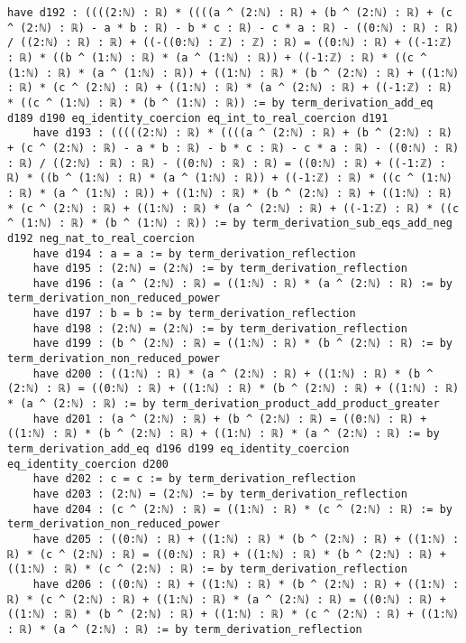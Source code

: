 \documentclass{article}
\begin{document}
\begin{tcolorbox}[colback=white!10, width=\linewidth]
\begin{lstlisting}[language=Lean4]
    have d192 : ((((2:ℕ) : ℝ) * ((((a ^ (2:ℕ) : ℝ) + (b ^ (2:ℕ) : ℝ) + (c ^ (2:ℕ) : ℝ) - a * b : ℝ) - b * c : ℝ) - c * a : ℝ) - ((0:ℕ) : ℝ) : ℝ) / ((2:ℕ) : ℝ) : ℝ) + ((-((0:ℕ) : ℤ) : ℤ) : ℝ) = ((0:ℕ) : ℝ) + ((-1:ℤ) : ℝ) * ((b ^ (1:ℕ) : ℝ) * (a ^ (1:ℕ) : ℝ)) + ((-1:ℤ) : ℝ) * ((c ^ (1:ℕ) : ℝ) * (a ^ (1:ℕ) : ℝ)) + ((1:ℕ) : ℝ) * (b ^ (2:ℕ) : ℝ) + ((1:ℕ) : ℝ) * (c ^ (2:ℕ) : ℝ) + ((1:ℕ) : ℝ) * (a ^ (2:ℕ) : ℝ) + ((-1:ℤ) : ℝ) * ((c ^ (1:ℕ) : ℝ) * (b ^ (1:ℕ) : ℝ)) := by term_derivation_add_eq d189 d190 eq_identity_coercion eq_int_to_real_coercion d191
    have d193 : (((((2:ℕ) : ℝ) * ((((a ^ (2:ℕ) : ℝ) + (b ^ (2:ℕ) : ℝ) + (c ^ (2:ℕ) : ℝ) - a * b : ℝ) - b * c : ℝ) - c * a : ℝ) - ((0:ℕ) : ℝ) : ℝ) / ((2:ℕ) : ℝ) : ℝ) - ((0:ℕ) : ℝ) : ℝ) = ((0:ℕ) : ℝ) + ((-1:ℤ) : ℝ) * ((b ^ (1:ℕ) : ℝ) * (a ^ (1:ℕ) : ℝ)) + ((-1:ℤ) : ℝ) * ((c ^ (1:ℕ) : ℝ) * (a ^ (1:ℕ) : ℝ)) + ((1:ℕ) : ℝ) * (b ^ (2:ℕ) : ℝ) + ((1:ℕ) : ℝ) * (c ^ (2:ℕ) : ℝ) + ((1:ℕ) : ℝ) * (a ^ (2:ℕ) : ℝ) + ((-1:ℤ) : ℝ) * ((c ^ (1:ℕ) : ℝ) * (b ^ (1:ℕ) : ℝ)) := by term_derivation_sub_eqs_add_neg d192 neg_nat_to_real_coercion
    have d194 : a = a := by term_derivation_reflection
    have d195 : (2:ℕ) = (2:ℕ) := by term_derivation_reflection
    have d196 : (a ^ (2:ℕ) : ℝ) = ((1:ℕ) : ℝ) * (a ^ (2:ℕ) : ℝ) := by term_derivation_non_reduced_power
    have d197 : b = b := by term_derivation_reflection
    have d198 : (2:ℕ) = (2:ℕ) := by term_derivation_reflection
    have d199 : (b ^ (2:ℕ) : ℝ) = ((1:ℕ) : ℝ) * (b ^ (2:ℕ) : ℝ) := by term_derivation_non_reduced_power
    have d200 : ((1:ℕ) : ℝ) * (a ^ (2:ℕ) : ℝ) + ((1:ℕ) : ℝ) * (b ^ (2:ℕ) : ℝ) = ((0:ℕ) : ℝ) + ((1:ℕ) : ℝ) * (b ^ (2:ℕ) : ℝ) + ((1:ℕ) : ℝ) * (a ^ (2:ℕ) : ℝ) := by term_derivation_product_add_product_greater
    have d201 : (a ^ (2:ℕ) : ℝ) + (b ^ (2:ℕ) : ℝ) = ((0:ℕ) : ℝ) + ((1:ℕ) : ℝ) * (b ^ (2:ℕ) : ℝ) + ((1:ℕ) : ℝ) * (a ^ (2:ℕ) : ℝ) := by term_derivation_add_eq d196 d199 eq_identity_coercion eq_identity_coercion d200
    have d202 : c = c := by term_derivation_reflection
    have d203 : (2:ℕ) = (2:ℕ) := by term_derivation_reflection
    have d204 : (c ^ (2:ℕ) : ℝ) = ((1:ℕ) : ℝ) * (c ^ (2:ℕ) : ℝ) := by term_derivation_non_reduced_power
    have d205 : ((0:ℕ) : ℝ) + ((1:ℕ) : ℝ) * (b ^ (2:ℕ) : ℝ) + ((1:ℕ) : ℝ) * (c ^ (2:ℕ) : ℝ) = ((0:ℕ) : ℝ) + ((1:ℕ) : ℝ) * (b ^ (2:ℕ) : ℝ) + ((1:ℕ) : ℝ) * (c ^ (2:ℕ) : ℝ) := by term_derivation_reflection
    have d206 : ((0:ℕ) : ℝ) + ((1:ℕ) : ℝ) * (b ^ (2:ℕ) : ℝ) + ((1:ℕ) : ℝ) * (c ^ (2:ℕ) : ℝ) + ((1:ℕ) : ℝ) * (a ^ (2:ℕ) : ℝ) = ((0:ℕ) : ℝ) + ((1:ℕ) : ℝ) * (b ^ (2:ℕ) : ℝ) + ((1:ℕ) : ℝ) * (c ^ (2:ℕ) : ℝ) + ((1:ℕ) : ℝ) * (a ^ (2:ℕ) : ℝ) := by term_derivation_reflection

\end{lstlisting}
\end{tcolorbox}
\end{document}
